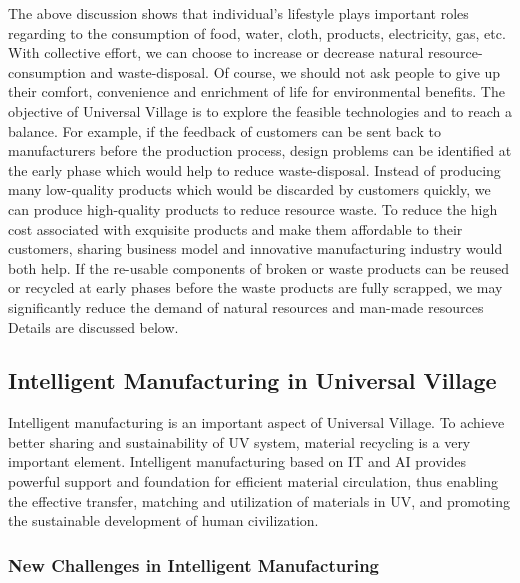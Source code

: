 \documentclass[letterpaper, twocolumn, 10pt, conference]{IEEEtran}
\begin{document}




The above discussion shows that individual’s lifestyle plays important roles regarding to the consumption of food, water, cloth, products, electricity, gas, etc. With collective effort, we can choose to increase or decrease natural resource-consumption and waste-disposal. %
Of course, we should not ask people to give up their comfort, convenience and enrichment of life for environmental benefits. The objective of Universal Village is to explore the feasible technologies and to reach a balance. 
For example, if the feedback of customers can be sent back to manufacturers before the production process,  design problems can be identified at the early phase which would help to reduce waste-disposal. Instead of producing many low-quality products which would be discarded by customers quickly, we can produce high-quality products to reduce resource waste. To reduce the high cost associated with exquisite products and make them affordable to their customers, sharing business model and innovative manufacturing industry would both help. 
If the re-usable components of broken or waste products can be reused or recycled at early phases before the waste products are fully scrapped, we may significantly reduce the demand of natural resources and man-made resources
Details are discussed below.

\subsection{Intelligent Manufacturing in Universal Village}
\label{ssec:intel_anufacturing}

Intelligent manufacturing is an important aspect of Universal Village. 
To achieve better sharing and sustainability of UV system, material recycling is a very important element. Intelligent manufacturing based on IT and AI provides powerful support and foundation for efficient material circulation, thus enabling the effective transfer, matching and utilization of materials in UV, and promoting the sustainable development of human civilization.

\subsubsection{New Challenges in Intelligent Manufacturing}
\end{document}
